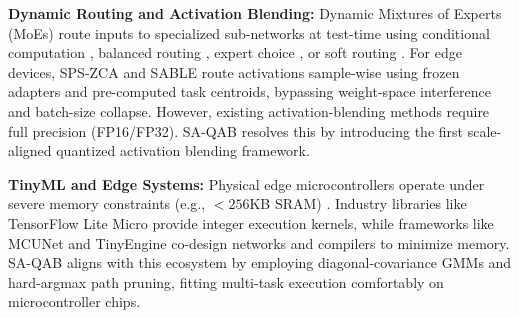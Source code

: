 \textbf{Dynamic Routing and Activation Blending:} Dynamic Mixtures of Experts (MoEs) route inputs to specialized sub-networks at test-time \cite{moe, switch_transformer} using conditional computation \cite{gshard}, balanced routing \cite{base_layers}, expert choice \cite{expert_choice}, or soft routing \cite{soft_moe, vmoe, coe}. For edge devices, SPS-ZCA \cite{sps_zca} and SABLE \cite{sable} route activations sample-wise using frozen adapters and pre-computed task centroids, bypassing weight-space interference and batch-size collapse. However, existing activation-blending methods require full precision (FP16/FP32). SA-QAB resolves this by introducing the first scale-aligned quantized activation blending framework.

\textbf{TinyML and Edge Systems:} Physical edge microcontrollers operate under severe memory constraints (e.g., $<256$KB SRAM) \cite{tinyml_survey}. Industry libraries like TensorFlow Lite Micro \cite{tflite_micro} provide integer execution kernels, while frameworks like MCUNet \cite{mcunet, mcunet_v2} and TinyEngine \cite{tinyengine} co-design networks and compilers to minimize memory. SA-QAB aligns with this ecosystem by employing diagonal-covariance GMMs and hard-argmax path pruning, fitting multi-task execution comfortably on microcontroller chips.

